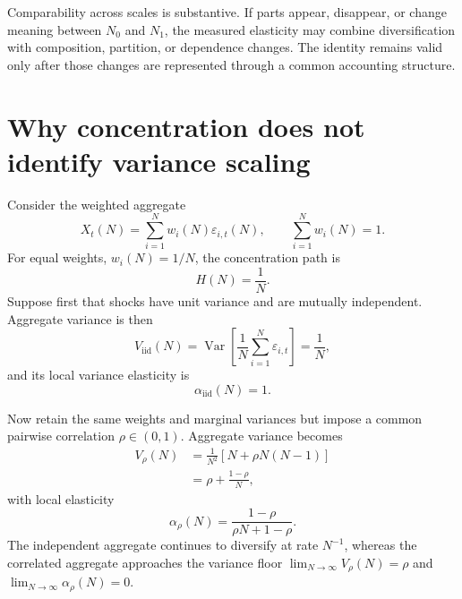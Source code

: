 \documentclass[a4paper,fleqn]{cas-dc}
\begin{document}
Comparability across scales is substantive. If parts appear, disappear,
or change meaning between $N_0$ and $N_1$, the measured elasticity may
combine diversification with composition, partition, or dependence
changes. The identity remains valid only after those changes are
represented through a common accounting structure.

\section{Why concentration does not identify variance scaling}
\label{sec:concentration_scaling}

Consider the weighted aggregate
\begin{equation}
\label{eq:weighted_aggregate}
    X_t(N)
    =
    \sum_{i=1}^{N}w_i(N)\varepsilon_{i,t}(N),
    \qquad
    \sum_{i=1}^{N}w_i(N)=1.
\end{equation}
For equal weights, $w_i(N)=1/N$, the concentration path is
\begin{equation}
\label{eq:equal_weight_concentration}
    H(N)=\frac{1}{N}.
\end{equation}
Suppose first that shocks have unit variance and are mutually
independent. Aggregate variance is then
\begin{equation}
\label{eq:iid_variance}
    V_{\mathrm{iid}}(N)
    =
    \operatorname{Var}\!\left[
        \frac{1}{N}\sum_{i=1}^{N}\varepsilon_{i,t}
    \right]
    =\frac{1}{N},
\end{equation}
and its local variance elasticity is
\begin{equation}
    \alpha_{\mathrm{iid}}(N)=1.
\end{equation}

Now retain the same weights and marginal variances but impose a common
pairwise correlation $\rho\in(0,1)$. Aggregate variance becomes
\begin{align}
\label{eq:correlated_variance}
    V_{\rho}(N)
    &=
    \frac{1}{N^2}\left[N+\rho N(N-1)\right]
    \nonumber\\
    &=
    \rho+\frac{1-\rho}{N},
\end{align}
with local elasticity
\begin{equation}
\label{eq:correlated_alpha}
    \alpha_{\rho}(N)
    =
    \frac{1-\rho}{\rho N+1-\rho}.
\end{equation}
The independent aggregate continues to diversify at rate $N^{-1}$,
whereas the correlated aggregate approaches the variance floor
$\lim_{N\to\infty}V_{\rho}(N)=\rho$ and
$\lim_{N\to\infty}\alpha_{\rho}(N)=0$.
\end{document}
